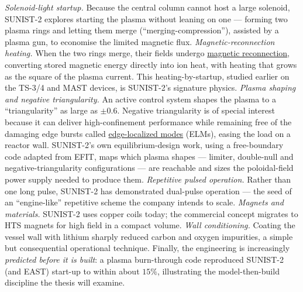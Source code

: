 \documentclass[11pt]{article}
\newcommand{\jl}[2]{\href{#2}{#1}}
\begin{document}
\emph{Solenoid-light startup.} Because the central column cannot host a large solenoid, SUNIST-2 explores starting the plasma without leaning on one --- forming two plasma rings and letting them merge (``merging-compression''), assisted by a plasma gun, to economise the limited magnetic flux.\cite{tan_iaea} \emph{Magnetic-reconnection heating.} When the two rings merge, their fields undergo \jl{magnetic reconnection}{https://en.wikipedia.org/wiki/Magnetic_reconnection}, converting stored magnetic energy directly into ion heat, with heating that grows as the square of the plasma current. This heating-by-startup, studied earlier on the TS-3/4 and MAST devices, is SUNIST-2's signature physics.\cite{ono2015,tanabe2015,tan_iaea} \emph{Plasma shaping and negative triangularity.} An active control system shapes the plasma to a ``triangularity'' as large as $\pm0.6$. Negative triangularity is of special interest because it can deliver high-confinement performance while remaining free of the damaging edge bursts called \jl{edge-localized modes}{https://en.wikipedia.org/wiki/Edge-localized_mode} (ELMs), easing the load on a reactor wall.\cite{nelson2024,camenen2007,sunist2control2024} SUNIST-2's own equilibrium-design work, using a free-boundary code adapted from EFIT, maps which plasma shapes --- limiter, double-null and negative-triangularity configurations --- are reachable and sizes the poloidal-field power supply needed to produce them.\cite{cheng2022} \emph{Repetitive pulsed operation.} Rather than one long pulse, SUNIST-2 has demonstrated dual-pulse operation --- the seed of an ``engine-like'' repetitive scheme the company intends to scale.\cite{tan_iaea} \emph{Magnets and materials.} SUNIST-2 uses copper coils today; the commercial concept migrates to HTS magnets for high field in a compact volume.\cite{costley2019,sykes2018} \emph{Wall conditioning.} Coating the vessel wall with lithium sharply reduced carbon and oxygen impurities, a simple but consequential operational technique.\cite{tan_iaea} Finally, the engineering is increasingly \emph{predicted before it is built}: a plasma burn-through code reproduced SUNIST-2 (and EAST) start-up to within about $15\%$, illustrating the model-then-build discipline the thesis will examine.\cite{li2025}
\end{document}
